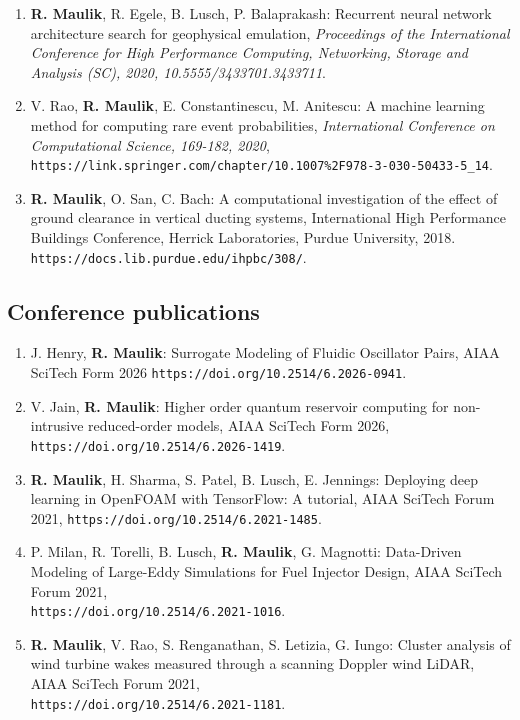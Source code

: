 \documentclass[letterpaper]{article}
\begin{document}
\begin{enumerate}
\item \textbf{R. Maulik}, R. Egele, B. Lusch,  P. Balaprakash: Recurrent neural network architecture search for geophysical emulation, {\it Proceedings of the International Conference for High Performance Computing, Networking, Storage and Analysis (SC), 2020, 10.5555/3433701.3433711}. 

\item V. Rao, \textbf{R. Maulik}, E. Constantinescu, M. Anitescu: A machine learning method for computing rare event probabilities, {\it International Conference on Computational Science, 169-182, 2020}, \\ \texttt{https://link.springer.com/chapter/10.1007\%2F978-3-030-50433-5\_14}. 

\item \textbf{R. Maulik}, O. San, C. Bach: A computational investigation of the effect of ground clearance in vertical ducting systems, International High Performance Buildings Conference, Herrick Laboratories, Purdue University, 2018. \\ \texttt{https://docs.lib.purdue.edu/ihpbc/308/}.

\end{enumerate}

\subsection*{Conference publications}

\begin{enumerate}

\item J. Henry, \textbf{R. Maulik}: Surrogate Modeling of Fluidic Oscillator Pairs, AIAA SciTech Form 2026 \texttt{https://doi.org/10.2514/6.2026-0941}.

\item V. Jain, \textbf{R. Maulik}: Higher order quantum reservoir computing for non-intrusive reduced-order models, AIAA SciTech Form 2026, \texttt{https://doi.org/10.2514/6.2026-1419}.

\item \textbf{R. Maulik}, H. Sharma, S. Patel, B. Lusch, E. Jennings: Deploying deep learning in OpenFOAM with TensorFlow: A tutorial, AIAA SciTech Forum 2021, \texttt{https://doi.org/10.2514/6.2021-1485}.

\item P. Milan, R. Torelli, B. Lusch, \textbf{R. Maulik}, G. Magnotti: Data-Driven Modeling of Large-Eddy Simulations for Fuel Injector Design, AIAA SciTech Forum 2021, \\ \texttt{https://doi.org/10.2514/6.2021-1016}.

\item \textbf{R. Maulik}, V. Rao, S. Renganathan, S. Letizia, G. Iungo: Cluster analysis of wind turbine wakes measured through a scanning Doppler wind LiDAR, AIAA SciTech Forum 2021, \\ \texttt{https://doi.org/10.2514/6.2021-1181}.

\end{enumerate}
\end{document}
